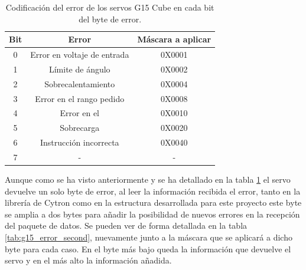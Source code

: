 	\begin{table}[htbp]
		\centering
		\caption{Codificación del error de los servos G15 Cube en cada bit del byte de error.}
		\label{tab:g15_error}
		\begin{center}
			\begin{tabular}{|c|c|c|}
				\hline
				\textbf{Bit} & \textbf{Error} & \textbf{Máscara a aplicar} \\
				\hline
				0 & Error en voltaje de entrada & 0X0001 \\
				\hline
				1 & Límite de ángulo & 0X0002 \\
				\hline
				2 & Sobrecalentamiento & 0X0004 \\
				\hline
				3 & Error en el rango pedido & 0X0008 \\
				\hline
				4 & Error en el \ingles{CheckSum} & 0X0010 \\
				\hline
				5 & Sobrecarga & 0X0020 \\
				\hline
				6 & Instrucción incorrecta & 0X0040 \\
				\hline
				7 & - & -  \\
				\hline
			\end{tabular}
		\end{center}
	\end{table}

	Aunque como se ha visto anteriormente y se ha detallado en la tabla \ref{tab:g15_error} el servo devuelve un solo byte de error, al leer la información recibida el error, tanto en la librería de Cytron como en la estructura desarrollada para este proyecto este byte se amplia a dos bytes para añadir la posibilidad de nuevos errores en la recepción del paquete de datos. Se pueden ver de forma detallada en la tabla \ref{tab:g15_error_second}, nuevamente junto a la máscara que se aplicará a dicho byte para cada caso. En el byte más bajo queda la información que devuelve el servo y en el más alto la información añadida.
	\\

